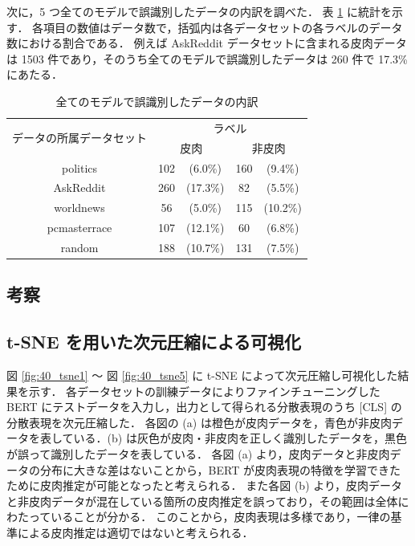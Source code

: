 次に，5 つ全てのモデルで誤識別したデータの内訳を調べた．
表 \ref{tb:4_result4} に統計を示す．
各項目の数値はデータ数で，括弧内は各データセットの各ラベルのデータ数における割合である．
例えば AskReddit データセットに含まれる皮肉データは 1503 件であり，そのうち全てのモデルで誤識別したデータは 260 件で 17.3\% にあたる．

\begin{table}[tb]
  \caption{全てのモデルで誤識別したデータの内訳}
  \label{tb:4_result4}
  \centering
  \begin{tabular}{c c c c c} \hline

\multirow{2}{*}{データの所属データセット} & \multicolumn{4}{c}{ラベル} \\ \cline{2-5}
 & \multicolumn{2}{c}{皮肉} & \multicolumn{2}{c}{非皮肉} \\ \hline
politics & 102 & (6.0\%) & 160 & (9.4\%) \\
AskReddit & 260 & (17.3\%) & 82 & (5.5\%) \\
worldnews & 56 & (5.0\%) & 115 & (10.2\%) \\
pcmasterrace &107 & (12.1\%) & 60 & (6.8\%) \\
random & 188 & (10.7\%) & 131 & (7.5\%) \\ \hline

  \end{tabular}
\end{table}





\afterpage{\clearpage}
\subsection{考察}

\subsection{t-SNE を用いた次元圧縮による可視化}
図 \ref{fig:40_tsne1} 〜 図 \ref{fig:40_tsne5} に t-SNE によって次元圧縮し可視化した結果を示す．
各データセットの訓練データによりファインチューニングした BERT にテストデータを入力し，出力として得られる分散表現のうち [CLS] の分散表現を次元圧縮した．
各図の (a) は橙色が皮肉データを，青色が非皮肉データを表している．(b) は灰色が皮肉・非皮肉を正しく識別したデータを，黒色が誤って識別したデータを表している．
各図 (a) より，皮肉データと非皮肉データの分布に大きな差はないことから，BERT が皮肉表現の特徴を学習できたために皮肉推定が可能となったと考えられる．
また各図 (b) より，皮肉データと非皮肉データが混在している箇所の皮肉推定を誤っており，その範囲は全体にわたっていることが分かる．
このことから，皮肉表現は多様であり，一律の基準による皮肉推定は適切ではないと考えられる．


